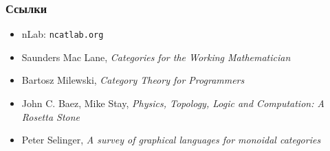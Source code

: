 \documentclass{beamer}
\begin{document}
\begin{frame}
\frametitle{Ссылки}
\begin{itemize}
\item nLab: \texttt{ncatlab.org}
\item Saunders Mac Lane, \textit{Categories for the Working Mathematician}
\item Bartosz Milewski, \textit{Category Theory for Programmers}
\item John C. Baez, Mike Stay, \textit{Physics, Topology, Logic and Computation: A Rosetta Stone}
\item Peter Selinger, \textit{A survey of graphical languages for monoidal categories}
\end{itemize}
\end{frame}
\end{document}
